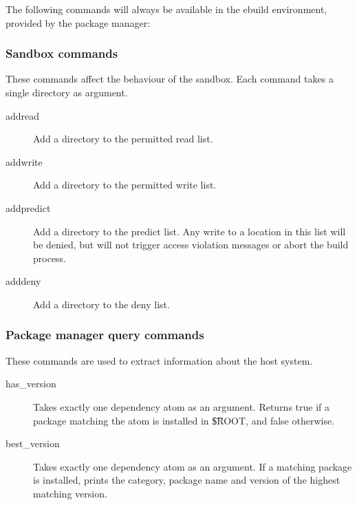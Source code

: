 \label{pkg-mgr-commands}

The following commands will always be available in the ebuild environment, provided by the package
manager:

\subsubsection{Sandbox commands}
These commands affect the behaviour of the sandbox. Each command takes a single directory as
argument.
\begin{description}
\item[addread] Add a directory to the permitted read list.
\item[addwrite] Add a directory to the permitted write list.
\item[addpredict] Add a directory to the predict list. Any write to a location in this list will be
    denied, but will not trigger access violation messages or abort the build process.
\item[adddeny] Add a directory to the deny list.
\end{description}

\subsubsection{Package manager query commands}
These commands are used to extract information about the host system.
\begin{description}
\item[has\_version] Takes exactly one dependency atom as an argument. Returns true if a package
    matching the atom is installed in \t{\$ROOT}, and false otherwise.
\item[best\_version] Takes exactly one dependency atom as an argument. If a matching package is
    installed, prints the category, package name and version of the highest matching version.
\end{description}

